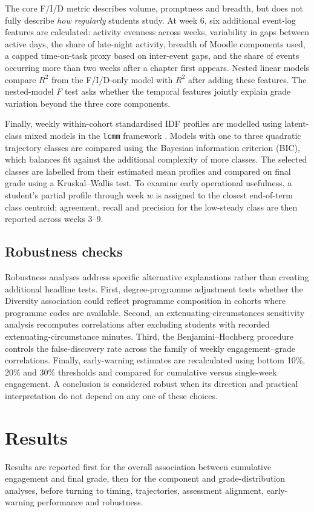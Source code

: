 \documentclass[11pt,a4paper]{article}
\begin{document}
The core F/I/D metric describes volume, promptness and breadth, but does not
fully describe \emph{how regularly} students study. At week 6, six additional
event-log features are calculated: activity evenness across weeks, variability in
gaps between active days, the share of late-night activity, breadth of Moodle
components used, a capped time-on-task proxy based on inter-event gaps, and the
share of events occurring more than two weeks after a chapter first appears.
Nested linear models compare $R^2$ from the F/I/D-only model with $R^2$ after
adding these features. The nested-model $F$ test asks whether the temporal
features jointly explain grade variation beyond the three core components.

Finally, weekly within-cohort standardised IDF profiles are modelled using
latent-class mixed models in the \texttt{lcmm} framework
\citep{proustlima2017}. Models with one to three quadratic trajectory classes
are compared using the Bayesian information criterion (BIC), which balances fit
against the additional complexity of more classes. The selected classes are
labelled from their estimated mean profiles and compared on final grade using a
Kruskal--Wallis test. To examine early operational usefulness, a student's
partial profile through week $w$ is assigned to the closest end-of-term class
centroid; agreement, recall and precision for the low-steady class are then
reported across weeks 3--9.

\subsection{Robustness checks}
Robustness analyses address specific alternative explanations rather than
creating additional headline tests. First, degree-programme adjustment tests
whether the Diversity association could reflect programme composition in cohorts
where programme codes are available. Second, an extenuating-circumstances
sensitivity analysis recomputes correlations after excluding students with
recorded extenuating-circumstance minutes. Third, the Benjamini--Hochberg
procedure controls the false-discovery rate across the family of weekly
engagement--grade correlations. Finally, early-warning estimates are recalculated
using bottom 10\%, 20\% and 30\% thresholds and compared for cumulative versus
single-week engagement. A conclusion is considered robust when its direction and
practical interpretation do not depend on any one of these choices.

\section{Results}
Results are reported first for the overall association between cumulative
engagement and final grade, then for the component and grade-distribution
analyses, before turning to timing, trajectories, assessment alignment,
early-warning performance and robustness.
\end{document}
